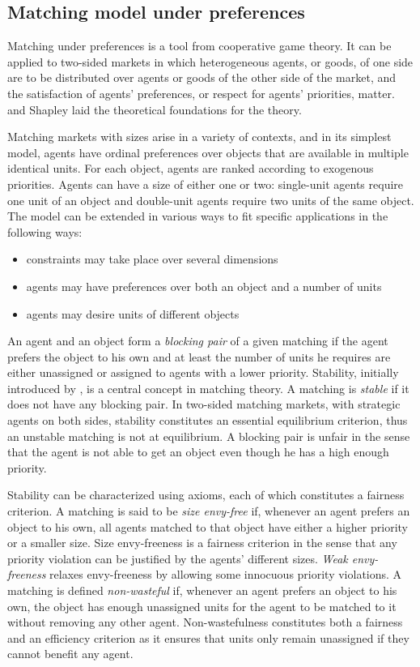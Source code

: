\subsection{Matching model under preferences}\label{matching-model-under-preferences}%

Matching under preferences is a tool from cooperative game theory.
It can be applied to two-sided markets in which heterogeneous agents, or goods, of one side are to be distributed over agents or goods of the other side of the market, and the satisfaction of agents’ preferences, or respect for agents’ priorities, matter. \citet{gale_1962} and Shapley laid the theoretical foundations for the theory.

Matching markets with sizes arise in a variety of contexts, and in its simplest model, agents have ordinal preferences over objects that are available in multiple identical units. For each object, agents are ranked according to exogenous priorities. Agents can have a size of either one or two: single-unit agents require one unit of an object and double-unit agents require two units of the same object. The model can be extended in various ways to fit specific applications in the following ways:
\begin{itemize}
\item constraints may take place over several dimensions
\item agents may have preferences over both an object and a number of units
\item agents may desire units of different objects
\end{itemize}
An agent and an object form a \textit{blocking pair} of a given matching if the agent prefers the object to his own and at least the number of units he requires are either unassigned or assigned to agents with a lower priority. Stability, initially introduced by \citet{gale_1962}, is a central concept in matching theory. A matching is \textit{stable} if it does not have any blocking pair. In two-sided matching markets, with strategic agents on both sides, stability constitutes an essential equilibrium criterion, thus an unstable matching is not at equilibrium. A blocking pair is unfair in the sense that the agent is not able to get an object even though he has a high enough priority.

Stability can be characterized using axioms, each of which constitutes a fairness criterion. A matching is said to be \textit{size envy-free} if, whenever an agent prefers an object to his own, all agents matched to that object have either a higher priority or a smaller size. Size envy-freeness is a fairness criterion in the sense that any priority violation can be justified by the agents' different sizes. \textit{Weak envy-freeness} relaxes envy-freeness by allowing some innocuous priority violations. A matching is defined \textit{non-wasteful} if, whenever an agent prefers an object to his own, the object has enough unassigned units for the agent to be matched to it without removing any other agent. Non-wastefulness constitutes both a fairness and an efficiency criterion as it ensures that units only remain unassigned if they cannot benefit any agent.

